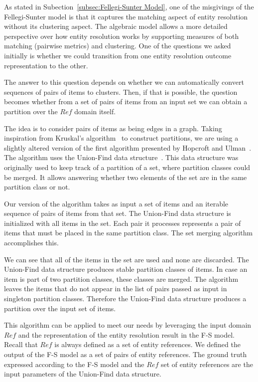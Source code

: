 
As stated in Subection~\ref{subsec:Fellegi-Sunter Model}, one of the misgivings
of the Fellegi-Sunter model is that it captures the matching aspect of entity
resolution without its clustering aspect.
The algebraic model allows a more detailed perspective over how entity
resolution works by supporting measures of both matching (pairwise metrics)
and clustering.
One of the questions we asked initially is whether we could transition from
one entity resolution outcome representation to the other.

The answer to this question depends on whether we can automatically convert
sequences of pairs of items to clusters.
Then, if that is possible, the question becomes whether from a set of pairs
of items from an input set we can obtain a partition over the $Ref$ domain
itself.

The idea is to consider pairs of items as being edges in a graph.
Taking inspiration from Kruskal's algorithm~\cite{kruskal1956} to construct
partitions, we are using a slightly altered version of the first algorithm
presented by Hopcroft and Ulman~\cite{hopcroft1973set}.
The algorithm uses the Union-Find data structure~\cite{unionfind1964}.
This data structure was originally used to keep track of a partition of a set,
where partition classes could be merged.
It allows answering whether two elements of the set are in the same partition
class or not.

Our version of the algorithm takes as input a set of items and an iterable
sequence of pairs of items from that set.
The Union-Find data structure is initialized with all items in the set.
Each pair it processes represents a pair of items that must be placed in the
same partition class.
The set merging algorithm accomplishes this.

We can see that all of the items in the set are used and none are discarded.
The Union-Find data structure produces stable partition classes of items.
In case an item is part of two partition classes, these classes are merged.
The algorithm leaves the items that do not appear in the list of pairs passed as
input in singleton partition classes.
Therefore the Union-Find data structure produces a partition over the input
set of items.

This algorithm can be applied to meet our needs by leveraging the input domain
$Ref$ and the representation of the entity resolution result in the F-S model.
Recall that $Ref$ is always defined as a set of entity references.
We defined the output of the F-S model as a set of pairs of entity
references.
The ground truth expressed according to the F-S model and the $Ref$ set of
entity references are the input parameters of the Union-Find data structure.

